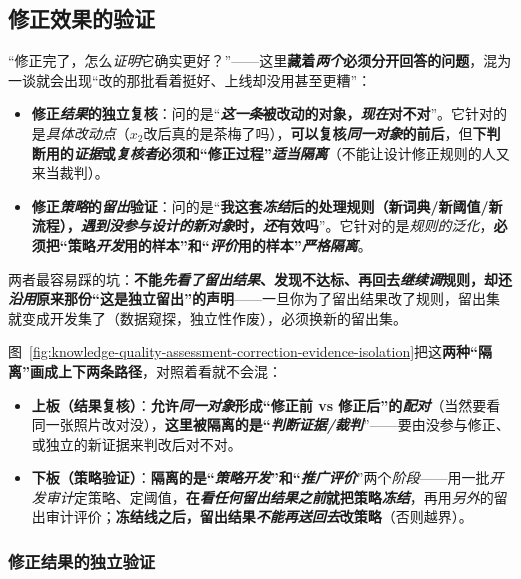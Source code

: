 \subsection{修正效果的验证}
\label{sec:knowledge-quality-assessment-correction-repair-validation}

“修正完了，怎么\emph{证明}它确实更好？”——这里\textbf{藏着\emph{两个}必须分开回答的问题}，混为一谈就会出现“改的那批看着挺好、上线却没用甚至更糟”：
\begin{itemize}\item \textbf{修正\emph{结果}的独立复核}：问的是“\textbf{\emph{这一条}被改动的对象，\emph{现在}对不对}”。它针对的是\emph{具体改动点}（$x_2$改后真的是茶梅了吗），\textbf{可以复核\emph{同一对象}的前后}，但\textbf{下判断用的\emph{证据}或\emph{复核者}必须和“修正过程”\emph{适当隔离}}（不能让设计修正规则的人又来当裁判）。\item \textbf{修正\emph{策略}的\emph{留出}验证}：问的是“\textbf{我这套\emph{冻结}后的处理规则（新词典/新阈值/新流程），\emph{遇到\emph{没参与设计}的\emph{新对象}}时，\emph{还}有效吗}”。它针对的是\emph{规则的泛化}，\textbf{必须把“策略\emph{开发}用的样本”和“\emph{评价}用的样本”\emph{严格隔离}}。\end{itemize}
两者最容易踩的坑：\textbf{不能\emph{先看了留出结果}、发现不达标、再回去\emph{继续调}规则，却还\emph{沿用}原来那份“这是独立留出”的声明}——一旦你为了留出结果改了规则，留出集就变成开发集了（数据窥探，独立性作废），必须换新的留出集。

图~\ref{fig:knowledge-quality-assessment-correction-evidence-isolation}把这\textbf{两种“隔离”画成上下两条路径}，对照着看就不会混：
\begin{itemize}\item \textbf{上板（结果复核）}：\textbf{允许\emph{同一对象}形成“修正前 vs 修正后”的\emph{配对}}（当然要看同一张照片改对没），\textbf{这里被隔离的是“\emph{判断证据/裁判}}”——要由没参与修正、或独立的新证据来判改后对不对。\item \textbf{下板（策略验证）}：\textbf{隔离的是“\emph{策略开发}”和“\emph{推广评价}}”两个\emph{阶段}——用一批\emph{开发审计}定策略、定阈值，\textbf{在\emph{看任何留出结果之前}就把策略\emph{冻结}}，再用\emph{另外}的留出审计评价；\textbf{冻结线之后，留出结果\emph{不能再送回去}改策略}（否则越界）。\end{itemize}

\subsubsection{修正结果的独立验证}
\label{sec:knowledge-quality-assessment-correction-independent-validation}


